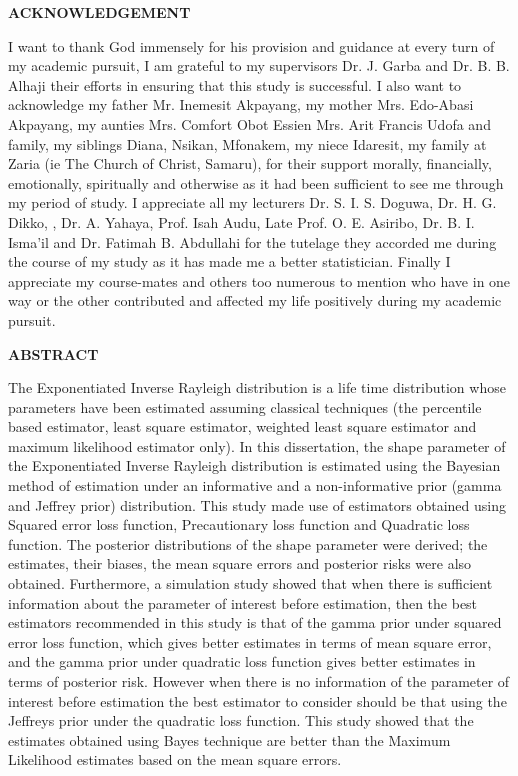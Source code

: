\documentclass[a4paper,12pt]{report}
\begin{document}
\newpage

\begin{center}
	\textbf{ACKNOWLEDGEMENT}\\
\end{center}
{\singlespacing 
I want to thank God immensely for his provision and guidance at every turn of my academic pursuit, I am grateful to my supervisors Dr. J. Garba and  Dr. B. B. Alhaji their efforts in ensuring that this study is successful. I also want to acknowledge my father Mr. Inemesit Akpayang, my mother Mrs. Edo-Abasi Akpayang, my aunties Mrs. Comfort Obot Essien Mrs. Arit Francis Udofa and family, my siblings Diana, Nsikan, Mfonakem, my niece Idaresit, my family at Zaria (ie The Church of Christ, Samaru), for their support morally, financially, emotionally, spiritually and otherwise as it had been sufficient to see me through my period of study.
I appreciate all my lecturers Dr. S. I. S. Doguwa, Dr. H. G. Dikko, , Dr. A. Yahaya, Prof. Isah Audu, Late Prof. O. E. Asiribo, Dr. B. I. Isma'il and Dr. Fatimah B. Abdullahi for the tutelage they accorded me during the course of my study as it has made me a better statistician. Finally I appreciate my course-mates and others too numerous to mention who have in one way or the other contributed and affected my life positively during my academic pursuit.
}





\newpage
{}


\begin{center}
	\textbf{ABSTRACT}\\
\end{center}
The Exponentiated Inverse Rayleigh distribution is a life time distribution whose parameters have been estimated assuming classical techniques (the percentile based estimator, least square estimator, weighted least square estimator and maximum likelihood estimator only). In this dissertation, the shape parameter of the Exponentiated Inverse Rayleigh distribution is estimated using the Bayesian method of estimation under an informative and a non-informative prior (gamma and Jeffrey prior) distribution. This study made use of estimators obtained using Squared error loss function, Precautionary loss function and Quadratic loss function. The posterior distributions of the shape parameter were derived; the estimates, their biases, the mean square errors and posterior risks were also obtained. Furthermore, a simulation study showed that when there is sufficient information about the parameter of interest before estimation, then the best estimators recommended in this study is that of the gamma prior under squared error loss function, which gives better estimates in terms of mean square error, and  the gamma prior under quadratic loss function gives better estimates in terms of posterior risk. However when there is no information of the parameter of interest before estimation the best estimator to consider should be that using the Jeffreys prior under the quadratic loss function. This study showed that the estimates obtained using Bayes technique are better than the Maximum Likelihood estimates based on the mean square errors.
\end{document}
